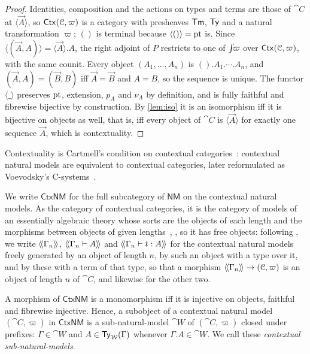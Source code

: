 \begin{proof}
    Identities, composition and the actions on types and terms are those of $\cat{C}$ at $\langle \vec{A} \rangle$, so $\mathsf{Ctx}(\mathcal{C}, \varpi)$ is a category with presheaves $\mathsf{Tm}$, $\mathsf{Ty}$ and a natural transformation $\varpi$; $()$ is terminal because $\langle () \rangle = \mathrm{pt}$ is. Since $\langle (\vec{A}, A) \rangle = \langle \vec{A} \rangle.A$, the right adjoint of $P$ restricts to one of $\int\!\!\varpi$ over $\mathsf{Ctx}(\mathcal{C}, \varpi)$, with the same counit. Every object $(A_1, \ldots, A_n)$ is $().A_1.\cdots.A_n$, and $(\vec{A}, A) = (\vec{B}, B)$ iff $\vec{A} = \vec{B}$ and $A = B$, so the sequence is unique. The functor $\langle \_ \rangle$ preserves $\mathrm{pt}$, extension, $p_A$ and $\nu_A$ by definition, and is fully faithful and fibrewise bijective by construction. By \cref{lem:iso} it is an isomorphism iff it is bijective on objects as well, that is, iff every object of $\cat{C}$ is $\langle \vec{A} \rangle$ for exactly one sequence $\vec{A}$, which is contextuality.
\end{proof}

Contextuality is Cartmell's condition on contextual categories~\cite[Def.~44]{AhrensLumsdaineNorth2024}: contextual natural models are equivalent to contextual categories, later reformulated as Voevodsky's C-systems~\cite[\S4.2]{AhrensLumsdaineNorth2024}.

We write $\mathsf{CtxNM}$ for the full subcategory of $\mathsf{NM}$ on the contextual natural models. As the category of contextual categories, it is the category of models of an essentially algebraic theory whose sorts are the objects of each length and the morphisms between objects of given lengths~\cite[\S2.1]{KapulkinLumsdaine2018}, \cite[Rem.~2.6]{Voevodsky2014Subsystems}, so it has free objects: following \cite[Def.~3.9]{KapulkinLumsdaine2018}, we write $\langle\!\langle \Gamma_n \rangle\!\rangle$, $\langle\!\langle \Gamma_n \vdash A \rangle\!\rangle$ and $\langle\!\langle \Gamma_n \vdash t : A \rangle\!\rangle$ for the contextual natural models freely generated by an object of length $n$, by such an object with a type over it, and by these with a term of that type, so that a morphism $\langle\!\langle \Gamma_n \rangle\!\rangle \to (\mathcal{C}, \varpi)$ is an object of length $n$ of $\cat{C}$, and likewise for the other two.

\begin{lemma}\label{lem:cxl-mono}
    A morphism of $\mathsf{CtxNM}$ is a monomorphism iff it is injective on objects, faithful and fibrewise injective. Hence, a subobject of a contextual natural model $(\cat{C}, \varpi)$ in $\mathsf{CtxNM}$ is a sub-natural-model $\cat{W}$ of $(\cat{C}, \varpi)$ closed under prefixes: $\Gamma \in \cat{W}$ and $A \in \mathsf{Ty}_{\mathcal{W}}(\Gamma)$ whenever $\Gamma.A \in \cat{W}$. We call these \emph{contextual sub-natural-models}.
\end{lemma}

